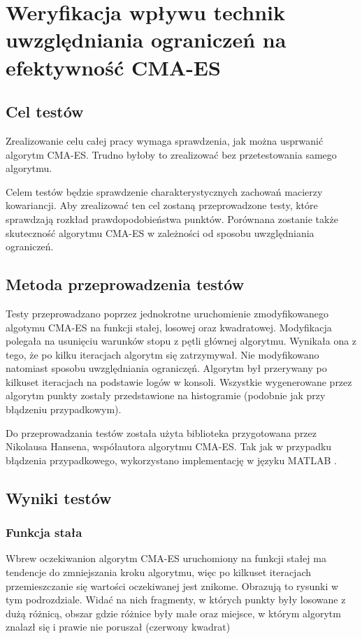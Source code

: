 \documentclass{mini}
\newcommand{\CMAES}{\mbox{CMA-ES}}
\begin{document}
\pagebreak

\section{Weryfikacja wpływu technik uwzględniania ograniczeń na efektywność CMA-ES}

\subsection{Cel testów}
Zrealizowanie celu całej pracy wymaga sprawdzenia, jak można usprwanić algorytm \CMAES. Trudno byłoby to zrealizować bez przetestowania samego algorytmu.

Celem testów będzie sprawdzenie charakterystycznych zachowań macierzy kowariancji. Aby zrealizować ten cel zostaną przeprowadzone testy, które sprawdzają rozkład prawdopodobieństwa punktów. Porównana zostanie także skuteczność algorytmu CMA-ES w zależności od sposobu uwzględniania ograniczeń.

\subsection{Metoda przeprowadzenia testów}
Testy przeprowadzano poprzez jednokrotne uruchomienie zmodyfikowanego algotymu CMA-ES na funkcji stałej, losowej oraz kwadratowej. Modyfikacja polegała na usunięciu warunków stopu z pętli głównej algorytmu. Wynikała ona z tego, że po kilku iteracjach algorytm się zatrzymywał. Nie modyfikowano natomiast sposobu uwzględniania ograniczęń. Algorytm był przerywany po kilkuset iteracjach na podstawie logów w konsoli. Wszystkie wygenerowane przez algorytm punkty zostały przedstawione na histogramie (podobnie jak przy błądzeniu przypadkowym).

Do przeprowadzania testów została użyta biblioteka przygotowana przez Nikolausa Hansena, współautora algorytmu CMA-ES. Tak jak w przypadku błądzenia przypadkowego, wykorzystano implementację w języku MATLAB \cite{cmaes_code}.

\subsection{Wyniki testów}

\subsubsection*{Funkcja stała}
Wbrew oczekiwanion algorytm CMA-ES uruchomiony na funkcji stałej ma tendencje do zmniejszania kroku algorytmu, więc po kilkuset iteracjach przemieszczanie się wartości oczekiwanej jest znikome. Obrazują to rysunki w tym podrozdziale. Widać na nich fragmenty, w których punkty były losowane z dużą różnicą, obszar gdzie różnice były małe oraz miejsce, w którym algorytm znalazł się i prawie nie poruszał (czerwony kwadrat)
\end{document}
